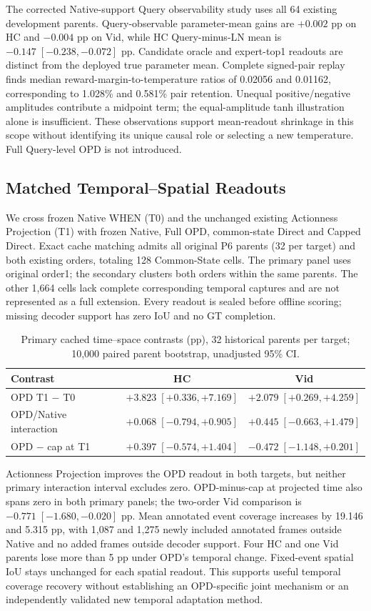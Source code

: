 \documentclass[10pt,twocolumn,letterpaper]{article}
\begin{document}
The corrected Native-support Query observability study uses all 64 existing
development parents. Query-observable parameter-mean gains are $+0.002$ pp on
HC and $-0.004$ pp on Vid, while HC Query-minus-LN mean is
$-0.147\;[-0.238,-0.072]$ pp. Candidate oracle and expert-top1 readouts are
distinct from the deployed true parameter mean. Complete signed-pair replay
finds median reward-margin-to-temperature ratios of 0.02056 and 0.01162,
corresponding to 1.028\% and 0.581\% pair retention. Unequal positive/negative
amplitudes contribute a midpoint term; the equal-amplitude tanh illustration
alone is insufficient. These observations support mean-readout shrinkage in
this scope without identifying its unique causal role or selecting a new
temperature. Full Query-level OPD is not introduced.

\subsection{Matched Temporal--Spatial Readouts}
We cross frozen Native WHEN (T0) and the unchanged existing Actionness
Projection (T1) with frozen Native, Full OPD, common-state Direct and Capped
Direct. Exact cache matching admits all original P6 parents (32 per target)
and both existing orders, totaling 128 Common-State cells. The primary panel
uses original order1; the secondary clusters both orders within the same
parents. The other 1,664 cells lack complete corresponding temporal captures
and are not represented as a full extension. Every readout is sealed before
offline scoring; missing decoder support has zero IoU and no GT completion.

\begin{table}[t]
\centering\small
\caption{Primary cached time--space contrasts (pp), 32 historical parents per target; 10,000 paired parent bootstrap, unadjusted 95\% CI.}\label{tab:time-space}
\begin{tabular}{lcc}\toprule
Contrast & HC & Vid \\
\midrule
OPD T1 $-$ T0 & $+3.823\;[+0.336,+7.169]$ & $+2.079\;[+0.269,+4.259]$ \\
OPD/Native interaction & $+0.068\;[-0.794,+0.905]$ & $+0.445\;[-0.663,+1.479]$ \\
OPD $-$ cap at T1 & $+0.397\;[-0.574,+1.404]$ & $-0.472\;[-1.148,+0.201]$ \\
\bottomrule\end{tabular}\end{table}
Actionness Projection improves the OPD readout in both targets, but neither
primary interaction interval excludes zero. OPD-minus-cap at projected time
also spans zero in both primary panels; the two-order Vid comparison is
$-0.771\;[-1.680,-0.020]$ pp. Mean annotated event coverage increases by
19.146 and 5.315 pp, with 1,087 and 1,275 newly included annotated frames
outside Native and no added frames outside decoder support. Four HC and one
Vid parents lose more than 5 pp under OPD's temporal change. Fixed-event
spatial IoU stays unchanged for each spatial readout. This supports useful
temporal coverage recovery without establishing an OPD-specific joint
mechanism or an independently validated new temporal adaptation method.
\end{document}
